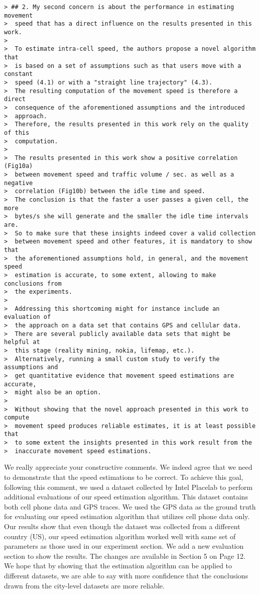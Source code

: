 \begin{verbatim}
> ## 2. My second concern is about the performance in estimating movement
>  speed that has a direct influence on the results presented in this work.
>
>  To estimate intra-cell speed, the authors propose a novel algorithm that
>  is based on a set of assumptions such as that users move with a constant
>  speed (4.1) or with a "straight line trajectory" (4.3).
>  The resulting computation of the movement speed is therefore a direct
>  consequence of the aforementioned assumptions and the introduced
>  approach.
>  Therefore, the results presented in this work rely on the quality of this
>  computation.
>
>  The results presented in this work show a positive correlation (Fig10a)
>  between movement speed and traffic volume / sec. as well as a negative
>  correlation (Fig10b) between the idle time and speed.
>  The conclusion is that the faster a user passes a given cell, the more
>  bytes/s she will generate and the smaller the idle time intervals are.
>  So to make sure that these insights indeed cover a valid collection
>  between movement speed and other features, it is mandatory to show that
>  the aforementioned assumptions hold, in general, and the movement speed
>  estimation is accurate, to some extent, allowing to make conclusions from
>  the experiments.
>
>  Addressing this shortcoming might for instance include an evaluation of
>  the approach on a data set that contains GPS and cellular data.
>  There are several publicly available data sets that might be helpful at
>  this stage (reality mining, nokia, lifemap, etc.).
>  Alternatively, running a small custom study to verify the assumptions and
>  get quantitative evidence that movement speed estimations are accurate,
>  might also be an option.
>
>  Without showing that the novel approach presented in this work to compute
>  movement speed produces reliable estimates, it is at least possible that
>  to some extent the insights presented in this work result from the
>  inaccurate movement speed estimations.
\end{verbatim}

We really appreciate your constructive comments. We indeed agree that we need to demonstrate that the speed estimations to be correct. To achieve this goal, following this comment, we used a dataset collected by Intel Placelab 
to perform additional evaluations of our speed estimation algorithm. This dataset contains both cell phone data and GPS traces. We used the GPS data as the ground truth for  evaluating our speed estimation algorithm that utilizes cell phone data only. Our results show that even though the dataset was collected from a different country (US), our speed estimation algorithm worked well with same set of parameters as those used in our experiment section. We add a new evaluation section to show the results.  The changes are available in Section 5 on Page 12.  We hope that by showing that the estimation algorithm can be applied to different datasets, we are able to say with more confidence that the conclusions drawn from the city-level datasets are more reliable. 


